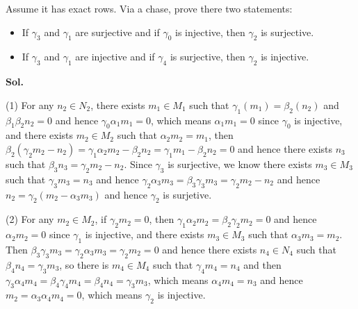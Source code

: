 \documentclass[lang=en,11pt,a4paper,citestyle =authoryear]{elegantpaper}
\begin{document}
Assume it has exact rows. Via a chase, prove there two statements:
\begin{itemize}
    \item If $\gamma_3$ and $\gamma_1$ are surjective and if $\gamma_0$ is injective, then $\gamma_2$ is surjective.
    \item If $\gamma_3$ and $\gamma_1$ are injective and if $\gamma_4$ is surjective, then $\gamma_2$ is injective.
\end{itemize}
\vspace{0.5em}
\textbf{Sol.} \par
(1) For any $n_2\in N_2$, there exists $m_1\in M_1$ such that $\gamma_1(m_1) = \beta_2(n_2)$ and $\beta_1\beta_2 n_2 = 0$ and hence $\gamma_0 \alpha_1 m_1 = 0$, which means $\alpha_1 m_1 = 0$ since $\gamma_0$ is injective, and there exists $m_2\in M_2$ such that $\alpha_2 m_2 = m_1$, then $\beta_2(\gamma_2 m_2 - n_2) = \gamma_1\alpha_2 m_2 - \beta_2 n_2 = \gamma_1 m_1 - \beta_2 n_2 = 0$ and hence there exists $n_3$ such that $\beta_3  n_3 = \gamma_2 m_2 - n_2$. Since $\gamma_3$ is surjective, we know there exists $m_3\in M_3$ such that $\gamma_3 m_3 = n_3$ and hence $\gamma_2 \alpha_3 m_3 = \beta_3\gamma_3 m_3 = \gamma_2 m_2 - n_2$ and hence $n_2 = \gamma_2(m_2 - \alpha_3 m_3)$ and hence $\gamma_2$ is surjetive.\par
(2) For any $m_2 \in M_2$, if $\gamma_2 m_2 = 0$, then $\gamma_1 \alpha_2 m_2 = \beta_2 \gamma_2 m_2 = 0$ and hence $\alpha_2 m_2 = 0$ since $\gamma_1$ is injective, and there exists $m_3\in M_3$ such that $\alpha_3 m_3 = m_2$. Then $\beta_3\gamma_3 m_3 = \gamma_2 \alpha_3 m_3 =  \gamma_2 m_2 =0$ and hence there exists $n_4\in N_4$ such that $\beta_4 n_4 = \gamma_3 m_3$, so there is $m_4\in M_4$ such that $\gamma_4 m_4 = n_4$ and then $\gamma_3 \alpha_4 m_4 = \beta_4 \gamma_4 m_4 = \beta_4 n_4 = \gamma_3 m_3$, which means $\alpha_4 m_4 = n_3$ and hence $m_2 = \alpha_3 \alpha_4 m_4 = 0$, which means $\gamma_2$ is injective.
\par 
\vspace{0.5em}
\end{document}
